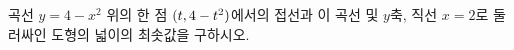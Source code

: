 곡선 $y=4-x^2$ 위의 한 점 $(t{,}\mkern3mu\mathopen{}4-t^2)$에서의 접선과 이 곡선 및 $y$축, 직선 $x=2$로 둘러싸인 도형의 넓이의 최솟값을 구하시오. 
